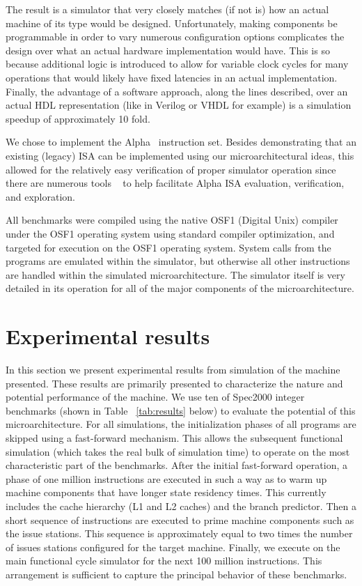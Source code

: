 \documentclass[10pt,dvips]{article}
\begin{document}
The result is a simulator that very closely matches (if
not is) how
an actual machine of its type would be designed.
Unfortunately, making components be programmable in order to
vary numerous configuration options complicates the design
over what an actual hardware implementation would have.
This is so because additional logic is introduced to allow
for variable clock cycles for many operations that would likely
have fixed latencies in an actual implementation.
Finally, the advantage of a software approach, along the
lines described, over an actual HDL representation (like in Verilog or
VHDL for example) is a simulation speedup of approximately 10 fold.

We chose to implement the Alpha~\cite{Bannon95} instruction set.
Besides demonstrating that an existing (legacy) ISA can be
implemented using our microarchitectural ideas,
this allowed for the relatively easy verification of proper
simulator operation since there are numerous 
tools ~\cite{srivastava94b,eustace94c}
to help
facilitate Alpha ISA evaluation, verification, and exploration.

All benchmarks were compiled using the native OSF1 (Digital Unix)
compiler under the OSF1 operating system 
using standard compiler optimization,
and targeted for execution on the OSF1 operating system.
System calls from the programs are emulated within the simulator,
but otherwise all other instructions are handled
within the simulated microarchitecture.
The simulator itself is very detailed in its operation for
all of the major components of the microarchitecture.
%
%
\vspace{-0.15in}
\section{Experimental results}
%
In this section we present experimental results from simulation
of the machine presented.
These results are primarily presented to characterize the
nature and potential performance of the machine.
We use ten of Spec2000 integer benchmarks 
(shown in Table ~\ref{tab:results} below) to evaluate the potential
of this microarchitecture. 
For all simulations, the initialization phases of all
programs are skipped using a fast-forward mechanism.
This allows the subsequent functional simulation (which takes
the real bulk of simulation time) to operate on the most
characteristic part of the benchmarks.
After the initial fast-forward operation, a phase of one million 
instructions are executed in such
a way as to warm up machine components that have longer
state residency times.  This currently includes the cache hierarchy
(L1 and L2 caches) and the branch predictor.
Then a short sequence of instructions are 
executed to prime machine components such as the issue stations.
This sequence is approximately equal to two times the number
of issues stations configured for the target machine.
Finally, we execute on the main functional cycle simulator
for the next 100 million instructions.  
This arrangement is sufficient
to capture the principal behavior of these 
benchmarks.~\cite{sherwood02}
\end{document}
